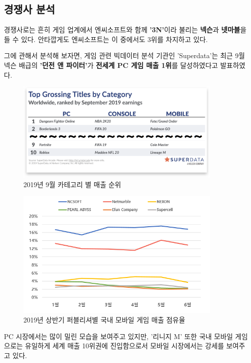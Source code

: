 \documentclass[11pt]{oblivoir}
\begin{document}
		\subsection{경쟁사 분석}
		경쟁사로는 흔히 게임 업계에서 엔씨소프트와 함께 \textbf{'3N'}이라 불리는 \textbf{넥슨}과 \textbf{넷마블}을 들 수 있다. 안타깝게도 엔씨소프트는 이 중에서도 3위를 차지하고 있다. 
		
		그에 관해서 분석해 보자면, 게임 관련 빅데이터 분석 기관인 'Superdata'는 최근 9월 넥슨 배급의 \textbf{'던전 앤 파이터'}가 \textbf{전세계 PC 게임 매출 1위}를 달성하였다고 발표하였다. 
		
		\begin{figure}[htbp]
			\centering
			\includegraphics[width=0.9\textwidth]{Pictures/septemberMaechul.png}
			\caption{2019년 9월 카테고리 별 매출 순위}
		\end{figure}
		
		\begin{figure}[htbp]
			\centering
			\includegraphics[width=0.9\textwidth]{Pictures/PublisherMaechul.png}
			\caption{2019년 상반기 퍼블리셔별 국내 모바일 게임 매출 점유율}
		\end{figure}
		
		PC 시장에서는 많이 밀린 모습을 보여주고 있지만, '리니지 M' 또한 국내 모바일 게임으로는 유일하게 세계 매출 10위권에 진입함으로서 모바일 시장에서는 강세를 보여주고 있다.
		
\end{document}
